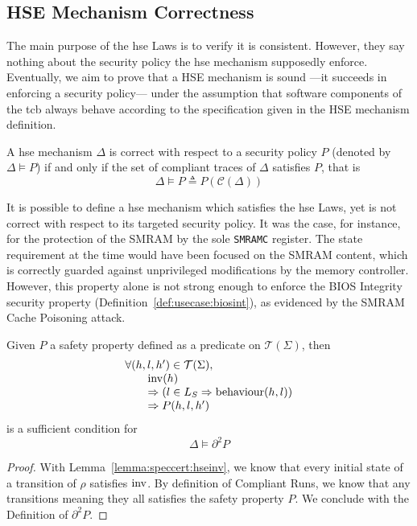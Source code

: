 \subsection{HSE Mechanism Correctness}
\label{subsec:speccert:correct}

The main purpose of the \ac{hse} Laws is to verify it is consistent.
%
However, they say nothing about the security policy the \ac{hse} mechanism
supposedly enforce.
%
Eventually, we aim to prove that a HSE mechanism is sound ---it succeeds in
enforcing a security policy--- under the assumption that software components of
the \ac{tcb} always behave according to the specification given in the HSE
mechanism definition.

\begin{definition}
  A \ac{hse} mechanism $\Delta$ is correct with respect to a security policy $P$
  (denoted by $\Delta \models P$) if and only if the set of compliant traces of
  $\Delta$ satisfies $P$, that is
  \[
    \Delta \models P \triangleq P(\mathcal{C}(\Delta))
  \]
\end{definition}

It is possible to define a \ac{hse} mechanism which satisfies the \ac{hse} Laws,
yet is not correct with respect to its targeted security policy.
%
It was the case, for instance, for the protection of the SMRAM by the sole
\texttt{SMRAMC} register.
%
The state requirement at the time would have been focused on the SMRAM content,
which is correctly guarded against unprivileged modifications by the memory
controller.
%
However, this property alone is not strong enough to enforce the BIOS Integrity
security property (Definition~\ref{def:usecase:biosint}), as evidenced by the
SMRAM Cache Poisoning attack.

\begin{theorem}
  \label{theorem:speccert:correcthse}
  Given $P$ a safety property defined as a predicate on $\mathcal{T}(\Sigma)$,
  then
  \[
    \begin{array}{l}
      \forall (h, l, h') \in \mathcal{T}(\Sigma), \\
      \qquad \mathrm{inv}(h) \\
      \qquad \Rightarrow (l \in L_{S} \Rightarrow \mathrm{behaviour}(h, l))\\
      \qquad \Rightarrow P(h, l, h')
    \end{array}
  \]
  is a sufficient condition for
  \[
    \Delta \models \partial^2 P
  \]

  \begin{proof}
    With Lemma~\ref{lemma:speccert:hseinv}, we know that every initial state of
    a transition of $\rho$ satisfies $\mathrm{inv}$.
    By definition of Compliant Runs, we know that any transitions meaning they
    all satisfies the safety property $P$.
    We conclude with the Definition of $\partial^2 P$.
  \end{proof}
\end{theorem}

